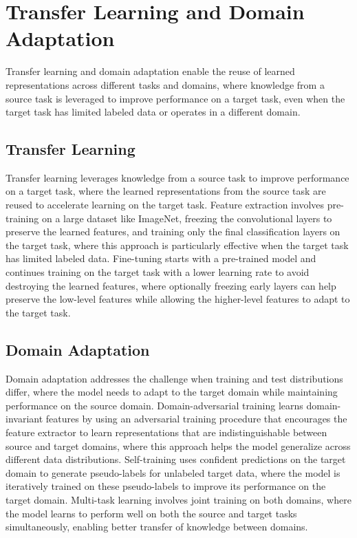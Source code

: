 
\section{Transfer Learning and Domain Adaptation }
\label{sec:transfer-learning}

Transfer learning and domain adaptation enable the reuse of learned representations across different tasks and domains, where knowledge from a source task is leveraged to improve performance on a target task, even when the target task has limited labeled data or operates in a different domain.

\subsection{Transfer Learning}

Transfer learning leverages knowledge from a source task to improve performance on a target task, where the learned representations from the source task are reused to accelerate learning on the target task. Feature extraction involves pre-training on a large dataset like ImageNet, freezing the convolutional layers to preserve the learned features, and training only the final classification layers on the target task, where this approach is particularly effective when the target task has limited labeled data. Fine-tuning starts with a pre-trained model and continues training on the target task with a lower learning rate to avoid destroying the learned features, where optionally freezing early layers can help preserve the low-level features while allowing the higher-level features to adapt to the target task.

\subsection{Domain Adaptation}

Domain adaptation addresses the challenge when training and test distributions differ, where the model needs to adapt to the target domain while maintaining performance on the source domain. Domain-adversarial training learns domain-invariant features by using an adversarial training procedure that encourages the feature extractor to learn representations that are indistinguishable between source and target domains, where this approach helps the model generalize across different data distributions. Self-training uses confident predictions on the target domain to generate pseudo-labels for unlabeled target data, where the model is iteratively trained on these pseudo-labels to improve its performance on the target domain. Multi-task learning involves joint training on both domains, where the model learns to perform well on both the source and target tasks simultaneously, enabling better transfer of knowledge between domains.

